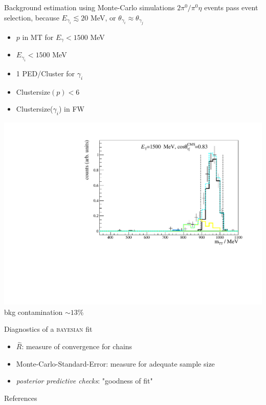 \documentclass[11pt,aspectratio=169,dvipsnames]{beamer}
\newcommand{\thecolor}{black!70!blue}
\begin{document}
	\begin{frame}{Background estimation using Monte-Carlo simulations}
		$2\pi^0/\pi^0\eta$ events pass event selection, because $E_{\gamma_{i}}\lesssim 20$ MeV, or $\theta_{\gamma_{i}}\approx\theta_{\gamma_{j}}$ 
		\begin{minipage}{.4\linewidth}
			\begin{tcolorbox}[colback=blue!5,colframe=\thecolor,title={Background reducing cuts}]
				\begin{itemize}
					\item $p$ in MT for $E_\gamma<1500$ MeV
					\item $E_{\gamma_{i}}<1500$ MeV
					\item 1 PED/Cluster for $\gamma_i$
					\item Clustersize$(p)<6$
					\item Clustersize($\gamma_{i}$) in FW
				\end{itemize}
			\end{tcolorbox}
		\end{minipage}
		\begin{minipage}{.59\linewidth}
			\centering
			\includegraphics[width=\linewidth]{inv_mass_bin_cuts}\\
			bkg contamination $\sim 13\%$
		\end{minipage}
		
	\end{frame}
	\begin{frame}{Diagnostics of a \textsc{bayesian} fit}
		\begin{itemize}
			\item $\hat{R}$: measure of convergence for chains
			\item Monte-Carlo-Standard-Error: measure for adequate sample size
			\item \emph{posterior predictive checks}: "goodness of fit"\\
			
		\end{itemize}
		\centering
	\end{frame}
	\begin{frame}[allowframebreaks]{References}
		\printbibliography
		
	\end{frame}
	

	
\end{document}
